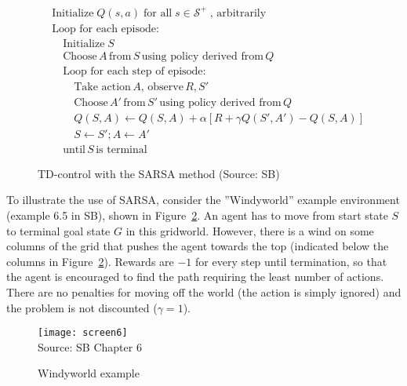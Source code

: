 \begin{figure}
\small
\begin{tcolorbox}[colback=code]
\vspace{-\baselineskip}
\begin{align*}
& \text{Initialize}\; Q(s, a) \; \text{for all} \; s \in \mathcal{S}^+ \; \text{, arbitrarily} \\
& \text{Loop for each episode:} \\
& \quad \text{Initialize}\; S \\
& \quad \text{Choose} \, A \, \text{from}\, S \, \text{using policy derived from} \, Q \\
& \quad \text{Loop for each step of episode:} \\
& \quad \quad \text{Take action}\, A, \, \text{observe} \, R, S' \\
& \quad \quad \text{Choose}\, A' \, \text{from}\, S' \, \text{using policy derived from} \, Q \\ 
& \quad \quad Q(S, A) \leftarrow Q(S, A) + \alpha \left[ R + \gamma Q(S', A') - Q(S, A) \right] \\
& \quad \quad S \leftarrow S'; A \leftarrow A' \\
& \quad \text{until}\, S\, \text{is terminal}
\end{align*}
\end{tcolorbox}
\caption[TD-control with SARSA]{TD-control with the SARSA method (Source: SB)}
\label{fig:sarsa}
\end{figure}

To illustrate the use of SARSA, consider the ''Windyworld'' example environment (example 6.5 in SB), shown in Figure~\ref{fig:windyworld}. An agent has to move from start state $S$ to terminal goal state $G$ in this gridworld. However, there is a wind on some columns of the grid that pushes the agent towards the top (indicated below the columns in Figure~\ref{fig:windyworld}). Rewards are $-1$ for every step until termination, so that the agent is encouraged to find the path requiring the least number of actions. There are no penalties for moving off the world (the action is simply ignored) and the problem is not discounted ($\gamma=1$).


\begin{figure}
\centering
\texttt{[image: screen6]} \\
\scriptsize Source: SB Chapter 6 \normalsize 
\caption{Windyworld example}
\label{fig:windyworld}
\end{figure}

